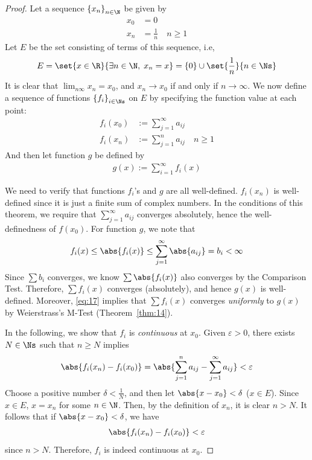\documentclass[thmcnt=section, 12pt]{elegantbook}
\begin{document}

\begin{proof}
    Let a sequence $\left\{x_n\right\}_{n \in \N}$ be given by 
    \begin{align*}
        x_0 &= 0 \\ 
        x_n &= \frac{1}{n} \quad n \geq 1
    \end{align*}
    Let $E$ be the set consisting of terms of this sequence, i.e, 
    \begin{align*}
        E = \set{x \in \R}{\exists n \in \N, \; x_n = x} = \left\{0\right\} \cup \set{\frac{1}{n}}{n \in \Ns}
    \end{align*}
    It is clear that $\lim_{n \infty} x_n = x_0$, and $x_n \to x_0$ if and only if $n \to \infty$. We now define a sequence of functions $\left\{f_i\right\}_{i \in \Ns}$ on $E$ by specifying the function value at each point:
    \begin{align*}
        f_i(x_0) &:= \sum_{j=1}^\infty a_{ij} \\ 
        f_i(x_n) &:= \sum_{j=1}^n a_{ij} 
        \quad n \geq 1
    \end{align*}
    And then let function $g$ be defined by 
    \begin{align*}
        g(x) := \sum_{i=1}^\infty f_i(x)
    \end{align*}

    \par We need to verify that functions $f_i$'s and $g$ are all well-defined. 
    $f_i(x_n)$ is well-defined since it is just a finite sum of complex numbers. In the conditions of this theorem, we require that $\sum_{j=1}^\infty a_{ij}$ converges absolutely, hence the well-definedness of $f(x_0)$.
    For function $g$, we note that 
    \begin{align}
        f_i(x) 
        \leq \abs{f_i(x)}
        \leq \sum_{j=1}^\infty \abs{a_{ij}}
        = b_i < \infty
        \label{eq:17}
    \end{align}
    Since $\sum b_i$ converges, we know $\sum \abs{f_i(x)}$ also converges by the Comparison Test. Therefore, $\sum f_i(x)$ converges (absolutely), and hence $g(x)$ is well-defined. Moreover, \eqref{eq:17} implies that $\sum f_i(x)$ converges \textit{uniformly} to $g(x)$ by Weierstrass's M-Test (Theorem~\ref{thm:14}).

    \par In the following, we show that $f_i$ is \textit{continuous} at $x_0$. Given $\varepsilon > 0$, there exists $N \in \Ns$ such that $n \geq N$ implies 
    \begin{align*}
        \abs{f_i(x_n) - f_i(x_0)}= \abs{\sum_{j=1}^n a_{ij} - \sum_{j=1}^\infty a_{ij}} < \varepsilon
    \end{align*}
    Choose a positive number $\delta < \frac{1}{N}$, and then let $\abs{x-x_0} < \delta$ ($x \in E$). Since $x \in E$, $x = x_n$ for some $n \in \N$. Then, by the definition of $x_n$, it is clear $n > N$. It follows that if $\abs{x - x_0} < \delta$, we have 
    \begin{align*}
        \abs{f_i(x_n) - f_i(x_0)} < \varepsilon
    \end{align*}
    since $n > N$. Therefore, $f_i$ is indeed continuous at $x_0$.


\end{proof}
\end{document}
